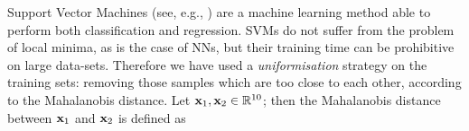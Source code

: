 %
%
%
%

Support Vector Machines (see, e.g.,
\cite{BGV92,Burges98,Cristianini00}) are a machine learning method
able to perform both classification and regression. SVMs do not suffer
from the problem of local minima, as is the case of NNs, but their
training time can be prohibitive on large data-sets. Therefore we have
used a \emph{uniformisation} strategy on the training sets: removing
those samples which are too close to each other, according to the
Mahalanobis distance. Let $\mathbf{x}_1, \mathbf{x}_2 \in \mathbb{R}^{10}$; then the
Mahalanobis distance between $\mathbf{x}_1$ and $\mathbf{x}_2$ is defined as

